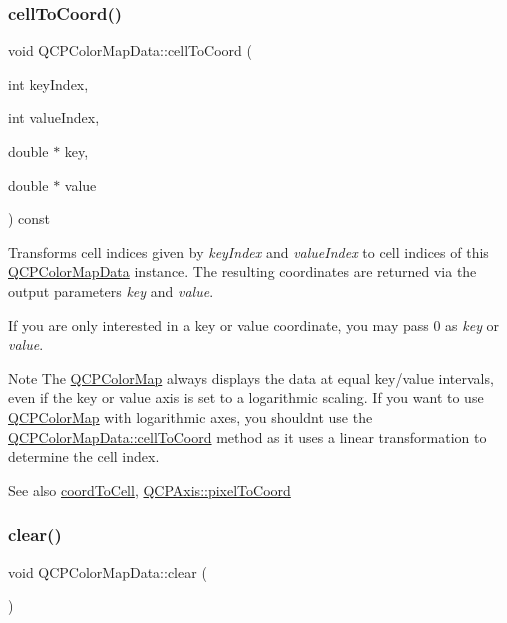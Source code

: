 \subsubsection{\texorpdfstring{cell\+To\+Coord()}{cellToCoord()}}
{\footnotesize\ttfamily void Q\+C\+P\+Color\+Map\+Data\+::cell\+To\+Coord (\begin{DoxyParamCaption}\item[{int}]{key\+Index,  }\item[{int}]{value\+Index,  }\item[{double $\ast$}]{key,  }\item[{double $\ast$}]{value }\end{DoxyParamCaption}) const}

Transforms cell indices given by {\itshape key\+Index} and {\itshape value\+Index} to cell indices of this \mbox{\hyperlink{class_q_c_p_color_map_data}{Q\+C\+P\+Color\+Map\+Data}} instance. The resulting coordinates are returned via the output parameters {\itshape key} and {\itshape value}.

If you are only interested in a key or value coordinate, you may pass 0 as {\itshape key} or {\itshape value}.

\begin{DoxyNote}{Note}
The \mbox{\hyperlink{class_q_c_p_color_map}{Q\+C\+P\+Color\+Map}} always displays the data at equal key/value intervals, even if the key or value axis is set to a logarithmic scaling. If you want to use \mbox{\hyperlink{class_q_c_p_color_map}{Q\+C\+P\+Color\+Map}} with logarithmic axes, you shouldn\textquotesingle{}t use the \mbox{\hyperlink{class_q_c_p_color_map_data_af1a36385c78ab624cd617065602408b6}{Q\+C\+P\+Color\+Map\+Data\+::cell\+To\+Coord}} method as it uses a linear transformation to determine the cell index.
\end{DoxyNote}
\begin{DoxySeeAlso}{See also}
\mbox{\hyperlink{class_q_c_p_color_map_data_aca5b29e0ca2f299c9060fc6e1f74d0c8}{coord\+To\+Cell}}, \mbox{\hyperlink{class_q_c_p_axis_a536ef8f624cac59b6b6fdcb495723c57}{Q\+C\+P\+Axis\+::pixel\+To\+Coord}} 
\end{DoxySeeAlso}
\mbox{\label{class_q_c_p_color_map_data_a9910ba830e96955bd5c8e5bef1e77ef3}} 
\subsubsection{\texorpdfstring{clear()}{clear()}}
{\footnotesize\ttfamily void Q\+C\+P\+Color\+Map\+Data\+::clear (\begin{DoxyParamCaption}{ }\end{DoxyParamCaption})}

